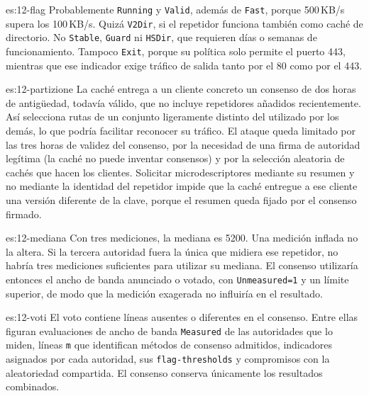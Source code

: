 \begin{soluzione}{es:12-flag}
Probablemente \texttt{Running} y \texttt{Valid}, además de \texttt{Fast}, porque 500\,KB/s supera los 100\,KB/s. Quizá \texttt{V2Dir}, si el repetidor funciona también como caché de directorio. No \texttt{Stable}, \texttt{Guard} ni \texttt{HSDir}, que requieren días o semanas de funcionamiento. Tampoco \texttt{Exit}, porque su política solo permite el puerto 443, mientras que ese indicador exige tráfico de salida tanto por el 80 como por el 443.
\end{soluzione}

\begin{soluzione}{es:12-partizione}
La caché entrega a un cliente concreto un consenso de dos horas de antigüedad, todavía válido, que no incluye repetidores añadidos recientemente. Así selecciona rutas de un conjunto ligeramente distinto del utilizado por los demás, lo que podría facilitar reconocer su tráfico. El ataque queda limitado por las tres horas de validez del consenso, por la necesidad de una firma de autoridad legítima (la caché no puede inventar consensos) y por la selección aleatoria de cachés que hacen los clientes. Solicitar microdescriptores mediante su resumen y no mediante la identidad del repetidor impide que la caché entregue a ese cliente una versión diferente de la clave, porque el resumen queda fijado por el consenso firmado.
\end{soluzione}

\begin{soluzione}{es:12-mediana}
Con tres mediciones, la mediana es 5200. Una medición inflada no la altera. Si la tercera autoridad fuera la única que midiera ese repetidor, no habría tres mediciones suficientes para utilizar su mediana. El consenso utilizaría entonces el ancho de banda anunciado o votado, con \texttt{Unmeasured=1} y un límite superior, de modo que la medición exagerada no influiría en el resultado.
\end{soluzione}

\begin{soluzione}{es:12-voti}
El voto contiene líneas ausentes o diferentes en el consenso. Entre ellas figuran evaluaciones de ancho de banda \texttt{Measured} de las autoridades que lo miden, líneas \texttt{m} que identifican métodos de consenso admitidos, indicadores asignados por cada autoridad, sus \texttt{flag-thresholds} y compromisos con la aleatoriedad compartida. El consenso conserva únicamente los resultados combinados.
\end{soluzione}

